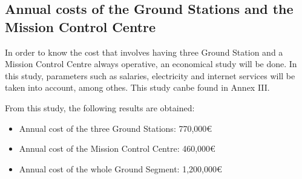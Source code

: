 \subsection{Annual costs of the Ground Stations and the Mission Control Centre}
In order to know the cost that involves having three Ground Station and a Mission Control Centre always operative, an economical study will be done. In this study, parameters such as salaries, electricity and internet services will be taken into account, among othes. This study canbe found in Annex III.

From this study, the following results are obtained:
\begin{itemize}
\item Annual cost of the three Ground Stations: 770,000\euro
\item Annual cost of the Mission Control Centre: 460,000\euro
\item Annual cost of the whole Ground Segment: 1,200,000\euro
\end{itemize}